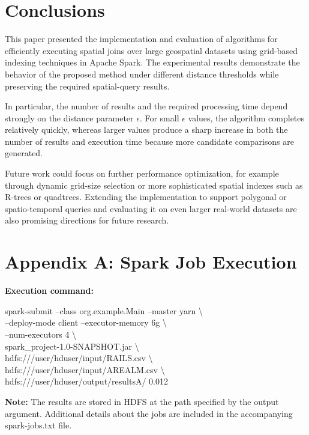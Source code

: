 \documentclass[sigconf,nonacm]{acmart}
\begin{document}
\section{Conclusions}
This paper presented the implementation and evaluation of algorithms for efficiently executing spatial joins over large geospatial datasets using grid-based indexing techniques in Apache Spark. The experimental results demonstrate the behavior of the proposed method under different distance thresholds while preserving the required spatial-query results.

In particular, the number of results and the required processing time depend strongly on the distance parameter $\epsilon$. For small $\epsilon$ values, the algorithm completes relatively quickly, whereas larger values produce a sharp increase in both the number of results and execution time because more candidate comparisons are generated.

Future work could focus on further performance optimization, for example through dynamic grid-size selection or more sophisticated spatial indexes such as R-trees or quadtrees. Extending the implementation to support polygonal or spatio-temporal queries and evaluating it on even larger real-world datasets are also promising directions for future research.

\section*{Appendix A: Spark Job Execution}

\textbf{Execution command:}
\begin{flushleft}
\small\ttfamily
spark-submit --class org.example.Main --master yarn \textbackslash\\
--deploy-mode client --executor-memory 6g \textbackslash\\
--num-executors 4 \textbackslash\\
spark\_project-1.0-SNAPSHOT.jar \textbackslash\\
hdfs:///user/hduser/input/RAILS.csv \textbackslash\\
hdfs:///user/hduser/input/AREALM.csv \textbackslash\\
hdfs:///user/hduser/output/resultsA/ 0.012
\end{flushleft}

\textbf{Note:}  
The results are stored in HDFS at the path specified by the output argument.  
Additional details about the jobs are included in the accompanying spark-jobs.txt file.






\end{document}
